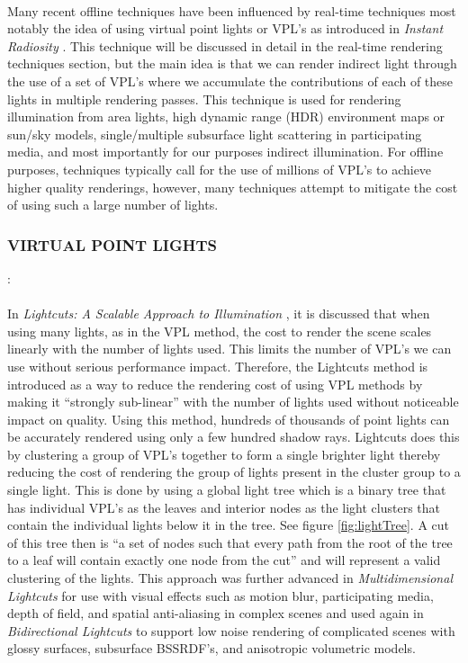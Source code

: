 \paragraph{}
Many recent offline techniques have been influenced by real-time techniques most notably the idea of using virtual point lights or VPL's as introduced in \textit{Instant Radiosity} \cite{Keller1997}.  This technique will be discussed in detail in the real-time rendering techniques section, but the main idea is that we can render indirect light through the use of a set of VPL's where we accumulate the contributions of each of these lights in multiple rendering passes.  This technique is used for rendering illumination from area lights, high dynamic range (HDR) environment maps or sun/sky models, single/multiple subsurface light scattering in participating media, and most importantly for our purposes indirect illumination.  For offline purposes, techniques typically call for the use of millions of VPL's to achieve higher quality renderings, however, many techniques attempt to mitigate the cost of using such a large number of lights.

\subsubsection{VIRTUAL POINT LIGHTS}: 
\paragraph{}
In \textit{Lightcuts: A Scalable Approach to Illumination} \cite{Walter2005a}, it is discussed that when using many lights, as in the VPL method, the cost to render the scene scales linearly with the number of lights used.  This limits the number of VPL's we can use without serious performance impact.  Therefore, the Lightcuts method is introduced as a way to reduce the rendering cost of using VPL methods by making it “strongly sub-linear” with the number of lights used without noticeable impact on quality.  Using this method, hundreds of thousands of point lights can be accurately rendered using only a few hundred shadow rays.  Lightcuts does this by clustering a group of VPL's together to form a single brighter light thereby reducing the cost of rendering the group of lights present in the cluster group to a single light.  This is done by using a global light tree which is a binary tree that has individual VPL's as the leaves and interior nodes as the light clusters that contain the individual lights below it in the tree.  See figure \ref{fig:lightTree}.  A cut of this tree then is ``a set of nodes such that every path from the root of the tree to a leaf will contain exactly one node from the cut'' and will represent a valid clustering of the lights.  This approach was further advanced in \textit{Multidimensional Lightcuts} \cite{Walter2006} for use with visual effects such as motion blur, participating media, depth of field, and spatial anti-aliasing in complex scenes and used again in \textit{Bidirectional Lightcuts} \cite{Walter2012} to support low noise rendering of complicated scenes with glossy surfaces, subsurface BSSRDF's, and anisotropic volumetric models.

